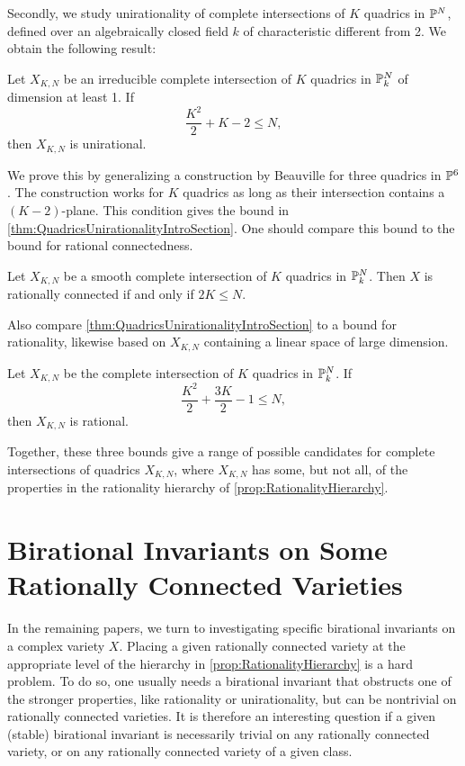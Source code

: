 Secondly, we study unirationality of complete intersections of $K$ quadrics in $\P^N$, defined over an algebraically closed field $k$ of characteristic different from 2. We obtain the following result:
\begin{theorem}
	\label{thm:QuadricsUnirationalityIntroSection}
	Let $X_{K,N}$ be an irreducible complete intersection of $K$ quadrics in $\P_k^N$ of dimension at least 1. If 
	\[\frac{K^2}{2} + K - 2 \leq N,\]
	then $X_{K,N}$ is unirational.
\end{theorem}
We prove this by generalizing a construction by Beauville for three quadrics in $\P^6$. The construction works for $K$ quadrics as long as their intersection contains a $(K-2)$-plane. This condition gives the bound in \cref{thm:QuadricsUnirationalityIntroSection}. One should compare this bound to the bound for rational connectedness.
\begin{proposition}
	\label{prop:QuadricsRationalConnectednessIntroSection}
	Let $X_{K,N}$ be a smooth complete intersection of $K$ quadrics in $\P_k^N$. Then $X$ is rationally connected if and only if $2K \leq N$.
\end{proposition}
Also compare \cref{thm:QuadricsUnirationalityIntroSection} to a bound for rationality, likewise based on $X_{K,N}$ containing a linear space of large dimension.
\begin{theorem}
	\label{thm:QuadricRationalBoundIntroSection}
	Let $X_{K,N}$ be the complete intersection of $K$ quadrics in $\P_k^N$. If
	\[ \frac{K^2}{2} + \frac{3K}{2} - 1 \leq N,\]
	then $X_{K,N}$ is rational.
\end{theorem}
Together, these three bounds give a range of possible candidates for complete intersections of quadrics $X_{K,N}$, where $X_{K,N}$ has some, but not all, of the properties in the rationality hierarchy of \cref{prop:RationalityHierarchy}.


\section{Birational Invariants on Some Rationally Connected Varieties}
In the remaining papers, we turn to investigating specific birational invariants on a complex variety $X$. Placing a given rationally connected variety at the appropriate level of the hierarchy in \cref{prop:RationalityHierarchy} is a hard problem. To do so, one usually needs a birational invariant that obstructs one of the stronger properties, like rationality or unirationality, but can be nontrivial on rationally connected varieties. It is therefore an interesting question if a given (stable) birational invariant is necessarily trivial on any rationally connected variety, or on any rationally connected variety of a given class.

